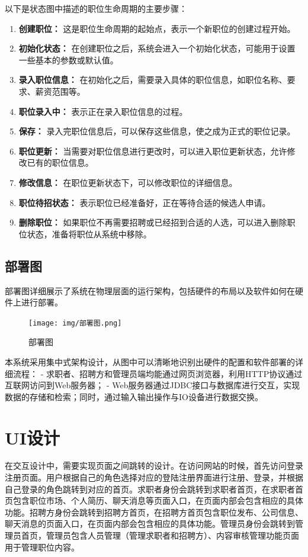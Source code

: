 \documentclass[UTF8,a4paper,10pt]{ctexart}
\begin{document}
以下是状态图中描述的职位生命周期的主要步骤：

\begin{enumerate}
    \item \textbf{创建职位：} 这是职位生命周期的起始点，表示一个新职位的创建过程开始。
    \item \textbf{初始化状态：} 在创建职位之后，系统会进入一个初始化状态，可能用于设置一些基本的参数或默认值。
    \item \textbf{录入职位信息：} 在初始化之后，需要录入具体的职位信息，如职位名称、要求、薪资范围等。
    \item \textbf{职位录入中：} 表示正在录入职位信息的过程。
    \item \textbf{保存：} 录入完职位信息后，可以保存这些信息，使之成为正式的职位记录。
    \item \textbf{职位更新：} 当需要对职位信息进行更改时，可以进入职位更新状态，允许修改已有的职位信息。
    \item \textbf{修改信息：} 在职位更新状态下，可以修改职位的详细信息。
    \item \textbf{职位待招状态：} 表示职位已经准备好，正在等待合适的候选人申请。
    \item \textbf{删除职位：} 如果职位不再需要招聘或已经招到合适的人选，可以进入删除职位状态，准备将职位从系统中移除。
\end{enumerate}

\subsection{部署图}

部署图详细展示了系统在物理层面的运行架构，包括硬件的布局以及软件如何在硬件上进行部署。

\begin{figure}[H]
    \centering
    \texttt{[image: img/部署图.png]} 
    \caption{部署图}
    \label{fig:部署图}
\end{figure}

本系统采用集中式架构设计，从图中可以清晰地识别出硬件的配置和软件部署的详细流程：
- 求职者、招聘方和管理员端均能通过网页浏览器，利用HTTP协议通过互联网访问到Web服务器；
- Web服务器通过JDBC接口与数据库进行交互，实现数据的存储和检索；同时，通过输入输出操作与IO设备进行数据交换。

\section{UI设计}

在交互设计中，需要实现页面之间跳转的设计。在访问网站的时候，首先访问登录注册页面。用户根据自己的角色选择对应的登陆注册界面进行注册、登录，并根据自己登录的角色跳转到对应的首页。求职者身份会跳转到求职者首页，在求职者首页包含职位市场、个人简历、聊天消息等页面入口，在页面内部会包含相应的具体功能。招聘方身份会跳转到招聘方首页，在招聘方首页包含职位发布、公司信息、聊天消息的页面入口，在页面内部会包含相应的具体功能。管理员身份会跳转到管理员首页，管理员包含人员管理（管理求职者和招聘方）、内容审核管理功能页面用于管理职位内容。
\end{document}
